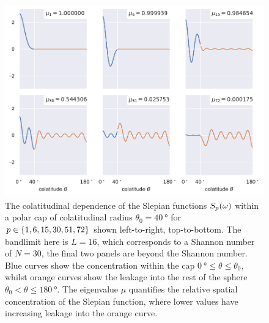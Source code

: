 \begin{figure}[htpb]
	\centering\capstart{}
	\includegraphics[width=\textwidth]{slepian_colatitude.pdf}
	\caption[
		The colatitudinal dependence of the polar cap Slepian functions
	]{
		The colatitudinal dependence of the Slepian functions \({S}_{p}(\omega)\) within a polar cap of colatitudinal radius \(\theta_{0}=\SI{40}{\degree}\) for \(p \in \{1, 6, 15, 30, 51, 72\}\) shown left-to-right, top-to-bottom.
		The bandlimit here is  \(L=16\), which corresponds to a Shannon number of \(N=30\), \ie{} the final two panels are beyond the Shannon number.
		Blue curves show the concentration within the cap \(\SI{0}{\degree} \leq \theta \leq \theta_{0}\), whilst orange curves show the leakage into the rest of the sphere \(\theta_{0} < \theta \leq \SI{180}{\degree}\).
		The eigenvalue \(\mu{}\) quantifies the relative spatial concentration of the Slepian function, where lower values have increasing leakage into the orange curve.
	}\label{fig:chapter2_slepian_colatitude}
\end{figure}
